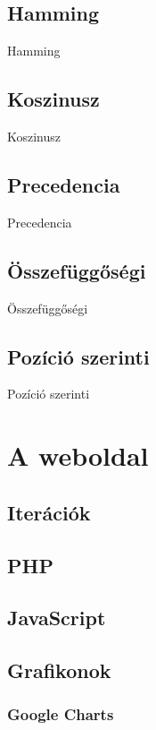 \documentclass[12pt]{report}
\theoremstyle{definition}
\begin{document}

\section{Hamming}
Hamming

\section{Koszinusz}
Koszinusz

\section{Precedencia}
Precedencia

\section{Összefüggőségi}
Összefüggőségi

\section{Pozíció szerinti}
Pozíció szerinti

\chapter{A weboldal}

\section{Iterációk}

\section{PHP}

\section{JavaScript}

\section{Grafikonok}
\subsection{Google Charts}
\end{document}
